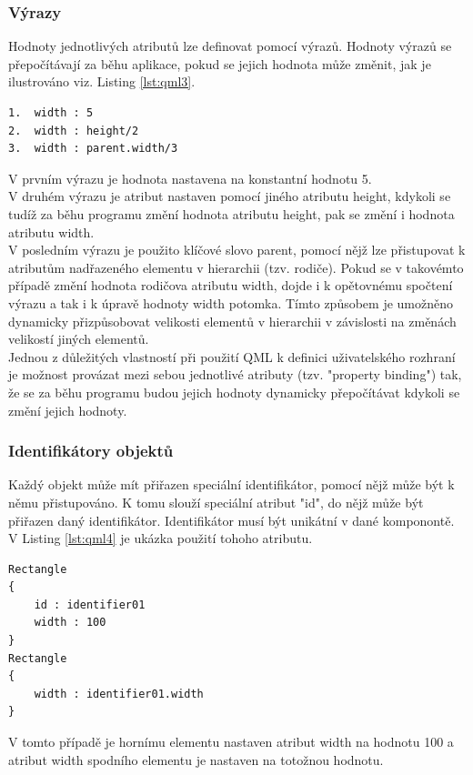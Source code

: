 \documentclass[report,11pt]{elsarticle}
\begin{document}
\subsubsection{Výrazy}
Hodnoty jednotlivých atributů lze definovat pomocí výrazů. Hodnoty výrazů se přepočítávají za běhu aplikace, pokud se jejich hodnota může změnit, jak je ilustrováno viz. Listing \ref{lst:qml3}.
\begin{lstlisting}[frame=single,caption=Několik ilustrativních příkladů formy výrazů.,label=lst:qml3]
1.	width : 5
2.	width : height/2
3.	width : parent.width/3
\end{lstlisting}
V prvním výrazu je hodnota nastavena na konstantní hodnotu 5.\\
V druhém výrazu je atribut nastaven pomocí jiného atributu height, kdykoli se tudíž za běhu programu změní hodnota atributu height, pak se změní i hodnota atributu width.\\
V posledním výrazu je použito klíčové slovo parent, pomocí nějž lze přistupovat k atributům nadřazeného elementu v hierarchii (tzv. rodiče). Pokud se v takovémto případě změní hodnota rodičova atributu width, dojde i k opětovnému spočtení výrazu a tak i k úpravě hodnoty width potomka. Tímto způsobem je umožněno dynamicky přizpůsobovat velikosti elementů v hierarchii v závislosti na změnách velikostí jiných elementů.\\
Jednou z důležitých vlastností při použití QML k definici uživatelského rozhraní je možnost provázat mezi sebou jednotlivé atributy (tzv. "property binding") tak, že se za běhu programu budou jejich hodnoty dynamicky přepočítávat kdykoli se změní jejich hodnoty.

\subsubsection{Identifikátory objektů}
Každý objekt může mít přiřazen speciální identifikátor, pomocí nějž může být k němu přistupováno.  K tomu slouží speciální atribut "id", do nějž může být přiřazen daný identifikátor. Identifikátor musí být unikátní v dané komponontě. V Listing \ref{lst:qml4} je ukázka použití tohoho atributu.
\begin{lstlisting}[frame=single,caption=Ukázka použití atributu id.,label=lst:qml4]
Rectangle
{
	id : identifier01
	width : 100
}
Rectangle
{
	width : identifier01.width
}
\end{lstlisting}
V tomto případě je hornímu elementu nastaven atribut width na hodnotu 100 a atribut width spodního elementu je nastaven na totožnou hodnotu.
\end{document}
